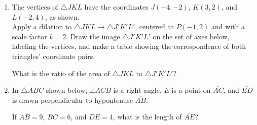 \documentclass[12pt, twoside]{article}
\begin{document}
\begin{enumerate}
  \item The vertices of $\triangle JKL$ have the coordinates $J(-4,-2)$, $K(3,2)$, and $L(-2,4)$, as shown. \\[0.25cm]
    Apply a dilation to $\triangle JKL \rightarrow \triangle J'K'L'$, centered at $P(-1,2)$ and with a scale factor $k=2$. Draw the image $\triangle J'K'L'$ on the set of axes below, labeling the vertices, and make a table showing the correspondence of both triangles' coordinate pairs.
      \begin{flushright}
      \end{flushright}
      What is the ratio of the area of $\triangle JKL$ to $\triangle J'K'L'$?

\newpage
  \item In $\triangle ABC$ shown below, $\angle ACB$ is a right angle, $E$ is a point on $\overline{AC}$, and $\overline{ED}$ is drawn perpendicular to hypontenuse $\overline{AB}$.
    \begin{center}
    \end{center} 
    If $AB = 9$, $BC = 6$, and $DE = 4$, what is the length of $\overline{AE}$? \vspace{3cm}


\end{enumerate}
\end{document}
